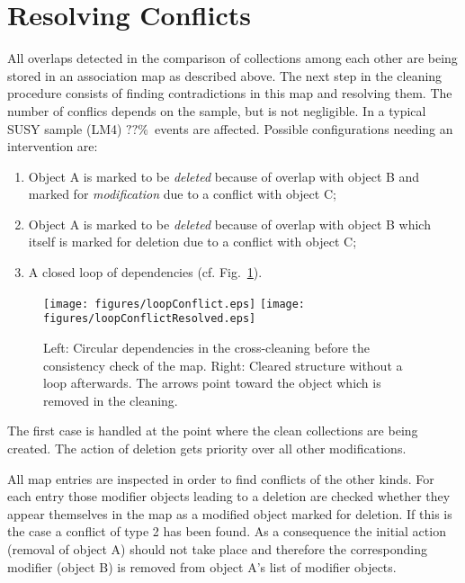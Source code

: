 \documentclass{cmspaper}
\begin{document}
\section{Resolving Conflicts}
\label{mapReso}
All overlaps detected in the comparison of collections among each other are
being stored in an association map as described above. The next step in the
cleaning procedure consists of finding contradictions in this map and resolving
them. The number of conflics depends on the sample, but is not negligible. In a
typical SUSY sample (LM4) $??\%$~events are affected. Possible configurations
needing an intervention are:
\begin{enumerate}
    \item Object A is marked to be \textit{deleted} because of overlap with
	object B and marked for \textit{modification} due to a conflict with
	object C;
    \item Object A is marked to be \textit{deleted} because of overlap with
	object B which itself is marked for deletion due to a conflict with
	object C;
    \item A closed loop of dependencies (cf. Fig.~\ref{fig:loopReso}).
\end{enumerate}

\begin{figure}[hb]
\begin{center}
    \texttt{[image: figures/loopConflict.eps]}
    \hspace*{1.5cm}
    \texttt{[image: figures/loopConflictResolved.eps]}
    \caption{Left: Circular dependencies in the cross-cleaning before the
    consistency check of the map. Right: Cleared structure without a loop
    afterwards. The arrows point toward the object which is removed in the
    cleaning.}
    \label{fig:loopReso}
\end{center}
\end{figure}

The first case is handled at the point where the clean collections are
being created. The action of deletion gets priority over all other
modifications.

All map entries are inspected in order to find conflicts of the other kinds.
For each entry those modifier objects leading to a deletion are checked whether
they appear themselves in the map as a modified object marked for deletion. If
this is the case a conflict of type 2 has been found. As a consequence the
initial action (removal of object A)  should not take place and  therefore the
corresponding modifier (object B) is removed from object A's list of modifier
objects.
\end{document}

